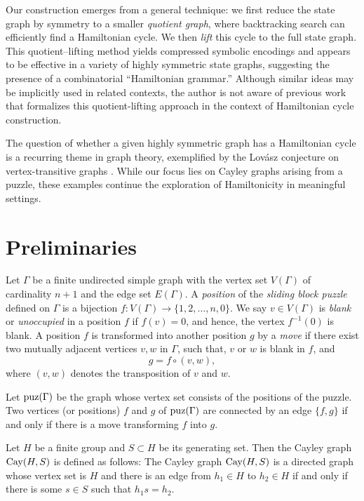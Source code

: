 \documentclass[lualatex,11pt]{article}
\begin{document}
Our construction emerges from a general technique: we first reduce the state graph by symmetry to a smaller \emph{quotient graph}, where backtracking search can efficiently find a Hamiltonian cycle. We then \emph{lift} this cycle to the full state graph. This quotient--lifting method yields compressed symbolic encodings and appears to be effective in a variety of highly symmetric state graphs, suggesting the presence of a combinatorial ``Hamiltonian grammar.''
Although similar ideas may be implicitly used in related contexts, 
the author is not aware of previous work that formalizes 
this quotient-lifting approach in the context of Hamiltonian cycle construction.

%

The question of whether a given highly symmetric graph has a Hamiltonian cycle 
is a recurring theme in graph theory, exemplified by the Lovász conjecture
 on vertex-transitive graphs \cite{lovasz1969combinatorial}. 
While our focus lies on Cayley graphs arising from a puzzle,
these examples continue the exploration of 
Hamiltonicity in  meaningful settings.

\section{Preliminaries}





Let $\Gamma$ be a finite undirected simple graph with the vertex set $V(\Gamma)$ 
of cardinality $n+1$ and 
the edge set $E(\Gamma)$. 
A {\em position} of the {\em sliding block puzzle}
defined on $\Gamma$ is a bijection $f: V(\Gamma)\to \{1,2,\ldots, n, 0\}$.
We say $v\in V(\Gamma)$ is {\em blank} or {\em unoccupied} in
a position $f$ if $f(v)=0$, and hence, 
the vertex $f^{-1}(0)$ is blank.
A position $f$ is transformed into another position $g$  by a
{\em move} if there exist two mutually
adjacent vertices $v,w$ in $\Gamma$, such that, $v$ or $w$
is blank in $f$, and
\[
 g = f\circ (v,w),
\]
where $(v,w)$ denotes the transposition of $v$ and $w$.


Let ${\rm puz}(\Gamma)$ be the graph whose vertex set consists of
the positions of the puzzle.
Two vertices (or positions) $f$ and $g$ of ${\rm puz}(\Gamma)$
are connected by an edge $\{f,g\}$
if and only if there is a move transforming $f$ into $g$.

Let $H$ be a finite group and $S\subset H$ 
be its generating set. 
Then the Cayley graph ${\rm Cay}(H, S)$ is defined as follows:
The Cayley graph ${\rm Cay}(H, S)$ is a directed graph whose vertex set is $H$ 
and there is an edge from $h_1\in H$ to $h_2\in H$
if and only if there is some $s\in S$ such that $h_1s=h_2$.
\end{document}
